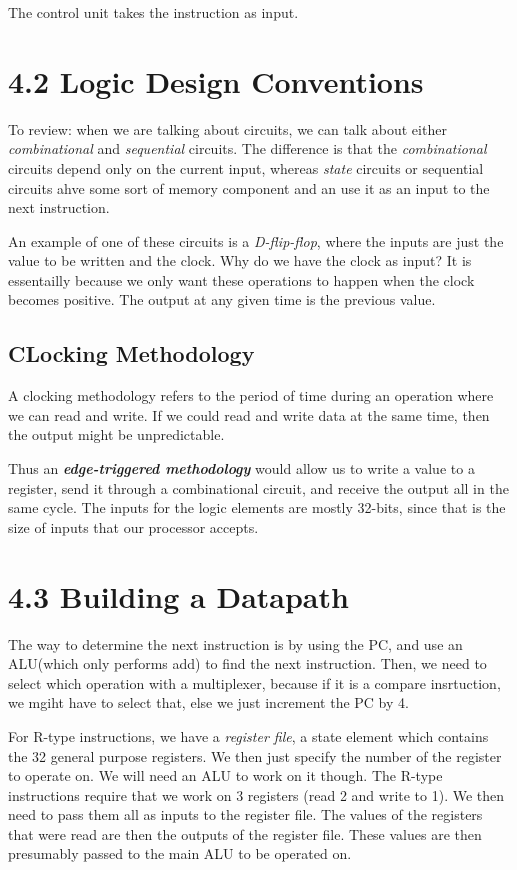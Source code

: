 \documentclass{article}
\begin{document}
The control unit takes the instruction as input.
\section{4.2 Logic Design Conventions}
To review: when we are talking about circuits, we can talk about either \textit{combinational} and 
\textit{sequential} circuits. The difference is that the \textit{combinational} circuits depend
only on the current input, whereas \textit{state} circuits or sequential circuits ahve some sort of memory 
component and an use it as an input to the next instruction.

An example of one of these circuits is a \textit{D-flip-flop}, where the inputs are just the value to be written
and the clock. Why do we have the clock as input? It is essentailly because we only want these operations to 
happen when the clock becomes positive. The output at any given time is the previous value.
\subsection{CLocking Methodology}
A clocking methodology refers to the period of time during an operation where we can read and write. If we 
could read and write data at the same time, then the output might be unpredictable.

Thus an \textbf{\textit{edge-triggered methodology}} would allow us to write a value to a register, send it 
through a combinational circuit, and receive the output all in the same cycle. The inputs for the logic 
elements are mostly 32-bits, since that is the size of inputs that our processor accepts.
\section{4.3 Building a Datapath}
The way to determine the next instruction is by using the PC, and use an ALU(which only performs add) to 
find the next instruction. Then, we need to select which operation with a multiplexer, because if it is 
a compare insrtuction, we mgiht have to select that, else we just increment the PC by 4.

For R-type instructions, we have a \textit{register file}, a state element which contains the 32 general 
purpose registers. We then just specify the number of the register to operate on. We will need an ALU to 
work on it though. The R-type instructions require that we work on 3 registers (read 2 and write to 1). We
then need to pass them all as inputs to the register file. The values of the registers that were read are 
then the outputs of the register file. These values are then presumably passed to the main ALU to be operated on.
\end{document}
